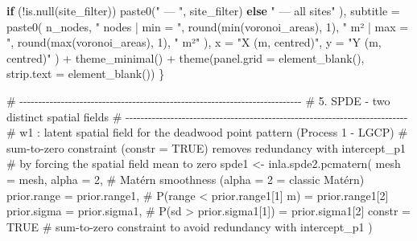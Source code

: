 \documentclass[
  letterpaper,
  DIV=11,
  numbers=noendperiod]{scrartcl}
\newenvironment{Shaded}{\begin{snugshade}}{\end{snugshade}}
\newcommand{\AttributeTok}[1]{\textcolor[rgb]{0.40,0.45,0.13}{#1}}
\newcommand{\CommentTok}[1]{\textcolor[rgb]{0.37,0.37,0.37}{#1}}
\newcommand{\ConstantTok}[1]{\textcolor[rgb]{0.56,0.35,0.01}{#1}}
\newcommand{\ControlFlowTok}[1]{\textcolor[rgb]{0.00,0.23,0.31}{\textbf{#1}}}
\newcommand{\DecValTok}[1]{\textcolor[rgb]{0.68,0.00,0.00}{#1}}
\newcommand{\FunctionTok}[1]{\textcolor[rgb]{0.28,0.35,0.67}{#1}}
\newcommand{\NormalTok}[1]{\textcolor[rgb]{0.00,0.23,0.31}{#1}}
\newcommand{\OtherTok}[1]{\textcolor[rgb]{0.00,0.23,0.31}{#1}}
\newcommand{\SpecialCharTok}[1]{\textcolor[rgb]{0.37,0.37,0.37}{#1}}
\newcommand{\StringTok}[1]{\textcolor[rgb]{0.13,0.47,0.30}{#1}}
\begin{document}
\begin{Shaded}
\begin{Highlighting}[]
          \ControlFlowTok{if}\NormalTok{ (}\SpecialCharTok{!}\FunctionTok{is.null}\NormalTok{(site\_filter)) }\FunctionTok{paste0}\NormalTok{(}\StringTok{" — "}\NormalTok{, site\_filter) }\ControlFlowTok{else} \StringTok{" — all sites"}
\NormalTok{        ),}
        \AttributeTok{subtitle =} \FunctionTok{paste0}\NormalTok{(}
\NormalTok{          n\_nodes, }\StringTok{" nodes | min = "}\NormalTok{, }\FunctionTok{round}\NormalTok{(}\FunctionTok{min}\NormalTok{(voronoi\_areas), }\DecValTok{1}\NormalTok{),}
          \StringTok{" m² | max = "}\NormalTok{, }\FunctionTok{round}\NormalTok{(}\FunctionTok{max}\NormalTok{(voronoi\_areas), }\DecValTok{1}\NormalTok{), }\StringTok{" m²"}
\NormalTok{        ),}
        \AttributeTok{x =} \StringTok{"X (m, centred)"}\NormalTok{, }\AttributeTok{y =} \StringTok{"Y (m, centred)"}
\NormalTok{      ) }\SpecialCharTok{+}
      \FunctionTok{theme\_minimal}\NormalTok{() }\SpecialCharTok{+}
      \FunctionTok{theme}\NormalTok{(}\AttributeTok{panel.grid =} \FunctionTok{element\_blank}\NormalTok{(), }\AttributeTok{strip.text =} \FunctionTok{element\_blank}\NormalTok{())}
\NormalTok{  \}}

  \CommentTok{\# {-}{-}{-}{-}{-}{-}{-}{-}{-}{-}{-}{-}{-}{-}{-}{-}{-}{-}{-}{-}{-}{-}{-}{-}{-}{-}{-}{-}{-}{-}{-}{-}{-}{-}{-}{-}{-}{-}{-}{-}{-}{-}{-}{-}{-}{-}{-}{-}{-}{-}{-}{-}{-}{-}{-}{-}{-}{-}{-}{-}{-}{-}{-}{-}{-}{-}{-}{-}{-}{-}{-}{-}{-}{-}{-}}
  \CommentTok{\# 5. SPDE {-} two distinct spatial fields}
  \CommentTok{\# {-}{-}{-}{-}{-}{-}{-}{-}{-}{-}{-}{-}{-}{-}{-}{-}{-}{-}{-}{-}{-}{-}{-}{-}{-}{-}{-}{-}{-}{-}{-}{-}{-}{-}{-}{-}{-}{-}{-}{-}{-}{-}{-}{-}{-}{-}{-}{-}{-}{-}{-}{-}{-}{-}{-}{-}{-}{-}{-}{-}{-}{-}{-}{-}{-}{-}{-}{-}{-}{-}{-}{-}{-}{-}{-}}
  \CommentTok{\# w1 : latent spatial field for the deadwood point pattern (Process 1 {-} LGCP)}
  \CommentTok{\# sum{-}to{-}zero constraint (constr = TRUE) removes redundancy with intercept\_p1}
  \CommentTok{\# by forcing the spatial field mean to zero}
\NormalTok{  spde1 }\OtherTok{\textless{}{-}} \FunctionTok{inla.spde2.pcmatern}\NormalTok{(}
    \AttributeTok{mesh =}\NormalTok{ mesh,}
    \AttributeTok{alpha =} \DecValTok{2}\NormalTok{, }\CommentTok{\# Matérn smoothness (alpha = 2 = classic Matérn)}
    \AttributeTok{prior.range =}\NormalTok{ prior.range1, }\CommentTok{\# P(range \textless{} prior.range1[1] m) = prior.range1[2]}
    \AttributeTok{prior.sigma =}\NormalTok{ prior.sigma1, }\CommentTok{\# P(sd \textgreater{} prior.sigma1[1]) = prior.sigma1[2]}
    \AttributeTok{constr =} \ConstantTok{TRUE} \CommentTok{\# sum{-}to{-}zero constraint to avoid redundancy with intercept\_p1}
\NormalTok{  )}


\end{Highlighting}
\end{Shaded}
\end{document}
